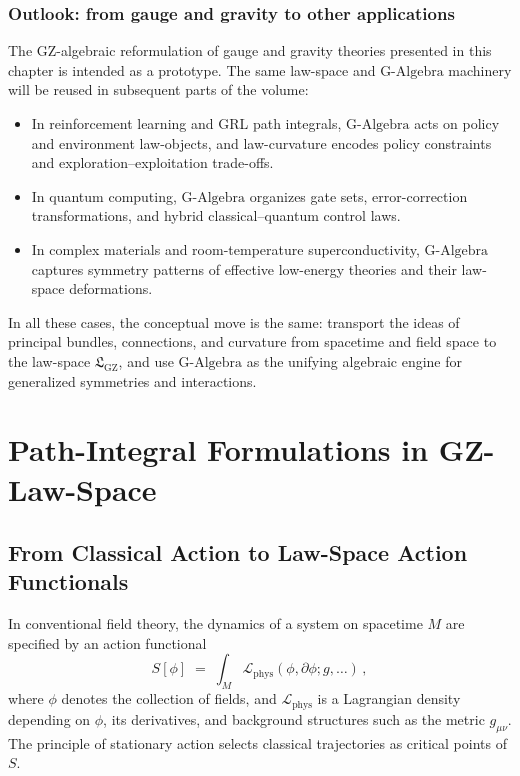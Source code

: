 \documentclass[11pt]{book}
\newcommand{\GAlgebra}{\text{G-Algebra}}
\newcommand{\GZLS}{\ensuremath{\mathfrak{L}_{\mathrm{GZ}}}}
\newcommand{\Base}{\ensuremath{M}}
\theoremstyle{plain}
\theoremstyle{definition}
\theoremstyle{remark}
\begin{document}
\subsection{Outlook: from gauge and gravity to other applications}

The GZ-algebraic reformulation of gauge and gravity theories presented
in this chapter is intended as a prototype. The same law-space and
$\GAlgebra$ machinery will be reused in subsequent parts of the volume:
\begin{itemize}
  \item In reinforcement learning and GRL path integrals, $\GAlgebra$
        acts on policy and environment law-objects, and law-curvature
        encodes policy constraints and exploration--exploitation trade-offs.
  \item In quantum computing, $\GAlgebra$ organizes gate sets,
        error-correction transformations, and hybrid classical--quantum
        control laws.
  \item In complex materials and room-temperature superconductivity,
        $\GAlgebra$ captures symmetry patterns of effective low-energy
        theories and their law-space deformations.
\end{itemize}

In all these cases, the conceptual move is the same: transport the
ideas of principal bundles, connections, and curvature from spacetime
and field space to the law-space $\GZLS$, and use $\GAlgebra$ as the
unifying algebraic engine for generalized symmetries and interactions.



\chapter[Path-Integral Formulations in GZ-Law-Space]{Path-Integral Formulations in GZ-Law-Space}
\label{chap:gz-law-path-integrals}



\section{From Classical Action to Law-Space Action Functionals}
\label{sec:classical-action-law-action}

In conventional field theory, the dynamics of a system on spacetime
$\Base$ are specified by an action functional
\[
   S[\phi] \;=\; \int_{\Base} \mathcal{L}_{\mathrm{phys}}(\phi,\partial\phi; g,\dots)\,,
\]
where $\phi$ denotes the collection of fields, and
$\mathcal{L}_{\mathrm{phys}}$ is a Lagrangian density depending on
$\phi$, its derivatives, and background structures such as the metric
$g_{\mu\nu}$. The principle of stationary action selects classical
trajectories as critical points of $S$.
\end{document}
